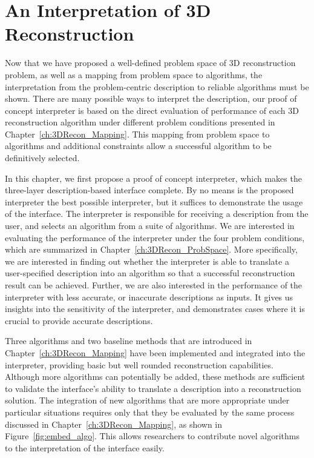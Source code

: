 
\chapter{An Interpretation of 3D Reconstruction}
\label{ch:3DRecon_Interp}
Now that we have proposed a well-defined problem space of 3D reconstruction problem, as well as a mapping from problem space to algorithms, the interpretation from the problem-centric description to reliable algorithms must be shown. There are many possible ways to interpret the description, our proof of concept interpreter is based on the direct evaluation of performance of each 3D reconstruction algorithm under different problem conditions presented in Chapter~\ref{ch:3DRecon_Mapping}. This mapping from problem space to algorithms and additional constraints allow a successful algorithm to be definitively selected.

In this chapter, we first propose a proof of concept interpreter, which makes the three-layer description-based interface complete. By no means is the proposed interpreter the best possible interpreter, but it suffices to demonstrate the usage of the interface. The interpreter is responsible for receiving a description from the user, and selects an algorithm from a suite of algorithms. We are interested in evaluating the performance of the interpreter under the four problem conditions, which are summarized in Chapter~\ref{ch:3DRecon_ProbSpace}. More specifically, we are interested in finding out whether the interpreter is able to translate a user-specified description into an algorithm so that a successful reconstruction result can be achieved. Further, we are also interested in the performance of the interpreter with less accurate, or inaccurate descriptions as inputs. It gives us insights into the sensitivity of the interpreter, and demonstrates cases where it is crucial to provide accurate descriptions.

Three algorithms and two baseline methods that are introduced in Chapter~\ref{ch:3DRecon_Mapping} have been implemented and integrated into the interpreter, providing basic but well rounded reconstruction capabilities. Although more algorithms can potentially be added, these methods are sufficient to validate the interface's ability to translate a description into a reconstruction solution. The integration of new algorithms that are more appropriate under particular situations requires only that they be evaluated by the same process discussed in Chapter~\ref{ch:3DRecon_Mapping}, as shown in Figure~\ref{fig:embed_algo}. This allows researchers to contribute novel algorithms to the interpretation of the interface easily.

